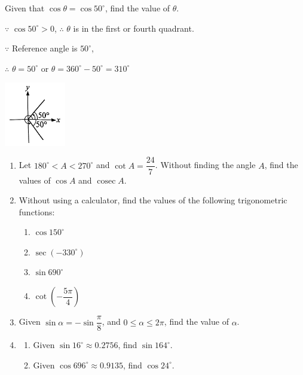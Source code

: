 \documentclass{report}
\begin{document}
\begin{question}
    \begin{multicols}{2}
        Given that $\cos\theta = \cos 50^\circ$, find the value of $\theta$.

    \sol{}

    \noindent $\because$ $\cos 50^\circ > 0$, $\therefore$ $\theta$ is in the first or fourth quadrant.
    
    \vspace{-1em}
    \noindent $\because$ Reference angle is $50^\circ$,

    \vspace{-1em}
    \noindent $\therefore$ $\theta = 50^\circ$ or $\theta = 360^\circ - 50^\circ = 310^\circ$

    \begin{center}
        \includegraphics[width=0.2\textwidth]{assets/9-17.jpg}
    \end{center}
    \end{multicols}
\end{question}

\begin{enumerate}
    \item Let $180^\circ < A < 270^\circ$ and $\cot A = \dfrac{24}{7}$. Without finding the angle $A$, find the values of $\cos A$ and $\operatorname{cosec} A$.

    \item Without using a calculator, find the values of the following trigonometric functions:
    \begin{multicols}{4}
        \begin{enumerate}[label=(\alph*)]
            \item $\cos 150^\circ$
            \item $\sec (-330^\circ)$
            \item $\sin 690^\circ$
            \item \vspace*{-1.8em} $\cot \left(-\dfrac{5 \pi}{4}\right)$
            \end{enumerate}
    \end{multicols}
    \vspace{-1.5em}
    \item Given $\sin \alpha = -\sin \dfrac{\pi}{8}$, and $0 \leq \alpha \leq 2 \pi$, find the value of $\alpha$.

\item \begin{enumerate}[label=(\alph*)]
\item Given $\sin 16^\circ \approx 0.2756$, find $\sin 164^\circ$.
\item Given $\cos 696^\circ \approx 0.9135$, find $\cos 24^\circ$.
\end{enumerate}
\end{enumerate}
\end{document}
